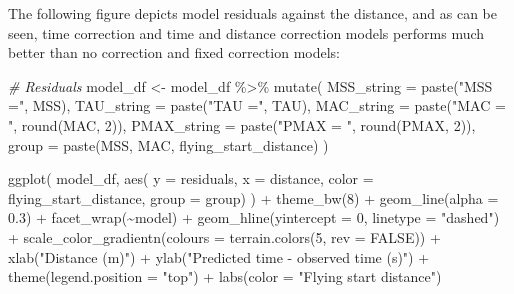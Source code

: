 \documentclass[fleqn,10pt,lineno]{wlpeerj} %
\newenvironment{Shaded}{\begin{snugshade}}{\end{snugshade}}
\newcommand{\AttributeTok}[1]{\textcolor[rgb]{0.77,0.63,0.00}{#1}}
\newcommand{\CommentTok}[1]{\textcolor[rgb]{0.56,0.35,0.01}{\textit{#1}}}
\newcommand{\ConstantTok}[1]{\textcolor[rgb]{0.00,0.00,0.00}{#1}}
\newcommand{\DecValTok}[1]{\textcolor[rgb]{0.00,0.00,0.81}{#1}}
\newcommand{\FloatTok}[1]{\textcolor[rgb]{0.00,0.00,0.81}{#1}}
\newcommand{\FunctionTok}[1]{\textcolor[rgb]{0.00,0.00,0.00}{#1}}
\newcommand{\NormalTok}[1]{#1}
\newcommand{\OtherTok}[1]{\textcolor[rgb]{0.56,0.35,0.01}{#1}}
\newcommand{\SpecialCharTok}[1]{\textcolor[rgb]{0.00,0.00,0.00}{#1}}
\newcommand{\StringTok}[1]{\textcolor[rgb]{0.31,0.60,0.02}{#1}}
\begin{document}
The following figure depicts model residuals against the distance, and as can be seen, time correction and time and distance correction models performs much better than no correction and fixed correction models:

\begin{Shaded}
\begin{Highlighting}[]
\CommentTok{\# Residuals}
\NormalTok{model\_df }\OtherTok{\textless{}{-}}\NormalTok{ model\_df }\SpecialCharTok{\%\textgreater{}\%}
  \FunctionTok{mutate}\NormalTok{(}
    \AttributeTok{MSS\_string =} \FunctionTok{paste}\NormalTok{(}\StringTok{"MSS ="}\NormalTok{, MSS),}
    \AttributeTok{TAU\_string =} \FunctionTok{paste}\NormalTok{(}\StringTok{"TAU ="}\NormalTok{, TAU),}
    \AttributeTok{MAC\_string =} \FunctionTok{paste}\NormalTok{(}\StringTok{"MAC = "}\NormalTok{, }\FunctionTok{round}\NormalTok{(MAC, }\DecValTok{2}\NormalTok{)),}
    \AttributeTok{PMAX\_string =} \FunctionTok{paste}\NormalTok{(}\StringTok{"PMAX = "}\NormalTok{, }\FunctionTok{round}\NormalTok{(PMAX, }\DecValTok{2}\NormalTok{)),}
    \AttributeTok{group =} \FunctionTok{paste}\NormalTok{(MSS, MAC, flying\_start\_distance)}
\NormalTok{  )}

\FunctionTok{ggplot}\NormalTok{(}
\NormalTok{  model\_df,}
  \FunctionTok{aes}\NormalTok{(}
    \AttributeTok{y =}\NormalTok{ residuals,}
    \AttributeTok{x =}\NormalTok{ distance,}
    \AttributeTok{color =}\NormalTok{ flying\_start\_distance,}
    \AttributeTok{group =}\NormalTok{ group)}
\NormalTok{) }\SpecialCharTok{+}
  \FunctionTok{theme\_bw}\NormalTok{(}\DecValTok{8}\NormalTok{) }\SpecialCharTok{+}
  \FunctionTok{geom\_line}\NormalTok{(}\AttributeTok{alpha =} \FloatTok{0.3}\NormalTok{) }\SpecialCharTok{+}
  \FunctionTok{facet\_wrap}\NormalTok{(}\SpecialCharTok{\textasciitilde{}}\NormalTok{model) }\SpecialCharTok{+}
  \FunctionTok{geom\_hline}\NormalTok{(}\AttributeTok{yintercept =} \DecValTok{0}\NormalTok{, }\AttributeTok{linetype =} \StringTok{"dashed"}\NormalTok{) }\SpecialCharTok{+}
  \FunctionTok{scale\_color\_gradientn}\NormalTok{(}\AttributeTok{colours =} \FunctionTok{terrain.colors}\NormalTok{(}\DecValTok{5}\NormalTok{, }\AttributeTok{rev =} \ConstantTok{FALSE}\NormalTok{)) }\SpecialCharTok{+}
  \FunctionTok{xlab}\NormalTok{(}\StringTok{"Distance (m)"}\NormalTok{) }\SpecialCharTok{+}
  \FunctionTok{ylab}\NormalTok{(}\StringTok{"Predicted time {-} observed time (s)"}\NormalTok{) }\SpecialCharTok{+}
  \FunctionTok{theme}\NormalTok{(}\AttributeTok{legend.position =} \StringTok{"top"}\NormalTok{) }\SpecialCharTok{+} 
  \FunctionTok{labs}\NormalTok{(}\AttributeTok{color =} \StringTok{"Flying start distance"}\NormalTok{)}
\end{Highlighting}
\end{Shaded}
\end{document}
